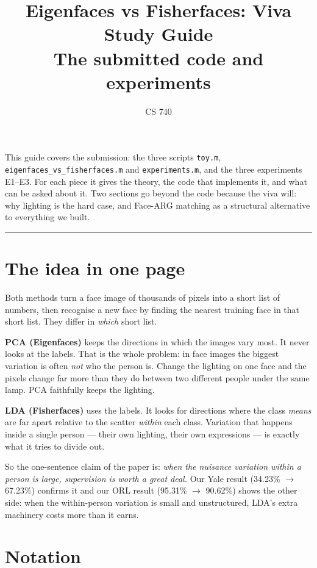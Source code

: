 \documentclass[11pt]{article}
\title{\textbf{Eigenfaces vs Fisherfaces: Viva Study Guide}\\[3pt]
\large The submitted code and experiments}
\author{CS 740}
\date{}
\begin{document}
\maketitle
\vspace{-1.3em}

This guide covers the submission: the three scripts \texttt{toy.m},
\texttt{eigenfaces\_vs\_}\allowbreak\texttt{fisherfaces.m} and
\texttt{experiments.m}, and the three experiments E1--E3. For each piece it
gives the theory, the code that implements it, and what can be asked about it.
Two sections go beyond the code because the viva will: why lighting is the hard
case, and Face-ARG matching as a structural alternative to everything we built.

{\small\tableofcontents}

\vspace{6pt}\hrule

\section{The idea in one page}

Both methods turn a face image of thousands of pixels into a short list of
numbers, then recognise a new face by finding the nearest training face in that
short list. They differ in \emph{which} short list.

\textbf{PCA (Eigenfaces)} keeps the directions in which the images vary most.
It never looks at the labels. That is the whole problem: in face images the
biggest variation is often \emph{not} who the person is. Change the lighting on
one face and the pixels change far more than they do between two different
people under the same lamp. PCA faithfully keeps the lighting.

\textbf{LDA (Fisherfaces)} uses the labels. It looks for directions where the
class \emph{means} are far apart relative to the scatter \emph{within} each
class. Variation that happens inside a single person --- their own lighting,
their own expressions --- is exactly what it tries to divide out.

So the one-sentence claim of the paper is: \emph{when the nuisance variation
within a person is large, supervision is worth a great deal.} Our Yale result
(34.23\% $\to$ 67.23\%) confirms it and our ORL result (95.31\% $\to$ 90.62\%)
shows the other side: when the within-person variation is small and
unstructured, LDA's extra machinery costs more than it earns.

\section{Notation}
\end{document}
